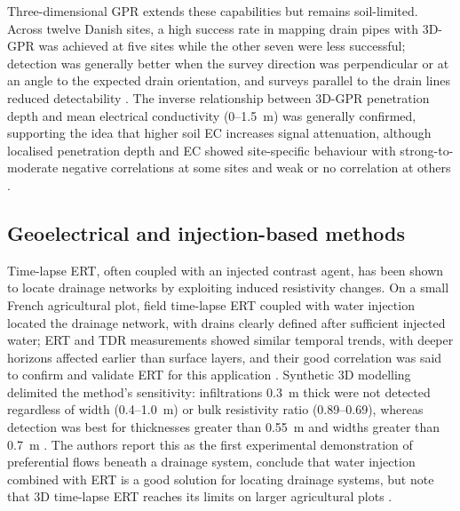Three-dimensional GPR extends these capabilities but remains soil-limited. Across twelve Danish sites, a high success rate in mapping drain pipes with 3D-GPR was achieved at five sites while the other seven were less successful; detection was generally better when the survey direction was perpendicular or at an angle to the expected drain orientation, and surveys parallel to the drain lines reduced detectability \parencite{Koganti2020}. The inverse relationship between 3D-GPR penetration depth and mean electrical conductivity (0--1.5~m) was generally confirmed, supporting the idea that higher soil EC increases signal attenuation, although localised penetration depth and EC showed site-specific behaviour with strong-to-moderate negative correlations at some sites and weak or no correlation at others \parencite{Koganti2020}.

\subsection{Geoelectrical and injection-based methods}

Time-lapse ERT, often coupled with an injected contrast agent, has been shown to locate drainage networks by exploiting induced resistivity changes. On a small French agricultural plot, field time-lapse ERT coupled with water injection located the drainage network, with drains clearly defined after sufficient injected water; ERT and TDR measurements showed similar temporal trends, with deeper horizons affected earlier than surface layers, and their good correlation was said to confirm and validate ERT for this application \parencite{Jouen2018}. Synthetic 3D modelling delimited the method's sensitivity: infiltrations 0.3~m thick were not detected regardless of width (0.4--1.0~m) or bulk resistivity ratio (0.89--0.69), whereas detection was best for thicknesses greater than 0.55~m and widths greater than 0.7~m \parencite{Jouen2018}. The authors report this as the first experimental demonstration of preferential flows beneath a drainage system, conclude that water injection combined with ERT is a good solution for locating drainage systems, but note that 3D time-lapse ERT reaches its limits on larger agricultural plots \parencite{Jouen2018}.

